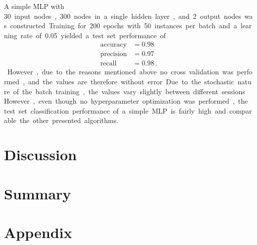 \documentclass[12pt, a4paper]{scrartcl}
\begin{document}
A simple MLP with \SI{30} input nodes, \SI{300} nodes in a single hidden layer, and \SI{2} output nodes was constructed. Training for \SI{200} epochs with \SI{50} instances per batch and a learning rate of \SI{0.05} yielded a test set performance of 
\begin{align*}
	\text{accuracy} &= 0.98 \\
	\text{precision} &= 0.97  \\
	\text{recall} &= 0.98  \, .
\end{align*}
However, due to the reasons mentioned above no cross validation was performed, and the values are therefore without error. Due to the stochastic nature of the batch training, the values vary slightly between different sessions. However, even though no hyperparameter optimization was performed, the test set classification performance of a simple MLP is fairly high and comparable the other presented algorithms.

\section{Discussion}
\label{sec:discu}



\section{Summary}


\section{Appendix}




\end{document}
